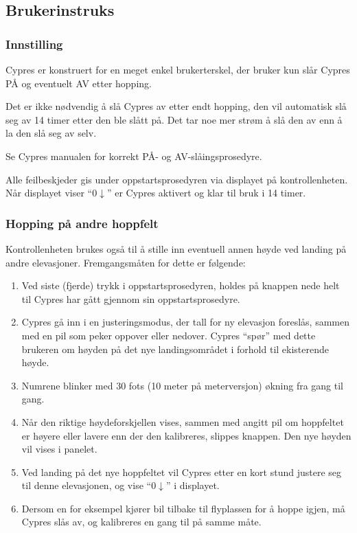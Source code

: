 \subsection{Brukerinstruks}
\subsubsection{Innstilling}
Cypres er konstruert for en meget enkel brukerterskel, der bruker kun slår Cypres PÅ og eventuelt AV etter hopping.

Det er ikke nødvendig å slå Cypres av etter endt hopping, den vil automatisk slå seg av 14 timer etter den ble slått på. Det tar noe mer strøm å slå den av enn å la den slå seg av selv.

Se Cypres manualen for korrekt PÅ- og AV-slåingsprosedyre.

Alle feilbeskjeder gis under oppstartsprosedyren via displayet på kontrollenheten. Når displayet viser ``0$\downarrow$'' er Cypres aktivert og klar til bruk i 14 timer.

\subsubsection{Hopping på andre hoppfelt}
Kontrollenheten brukes også til å stille inn eventuell annen høyde ved landing på andre elevasjoner. Fremgangsmåten for dette er følgende:
\begin{enumerate}
\item Ved siste (fjerde) trykk i oppstartsprosedyren, holdes på knappen nede helt til Cypres har gått gjennom sin oppstartsprosedyre.
\item Cypres gå inn i en justeringsmodus, der tall for ny elevasjon foreslås, sammen med en pil som peker oppover eller nedover. Cypres ``spør'' med dette brukeren om høyden på det nye landingsområdet i forhold til ekisterende høyde.
\item Numrene blinker med 30 fots (10 meter på meterversjon) økning fra gang til gang.
\item Når den riktige høydeforskjellen vises, sammen med angitt pil om hoppfeltet er høyere eller lavere enn der den kalibreres, slippes knappen. Den nye høyden vil vises i panelet.
\item Ved landing på det nye hoppfeltet vil Cypres etter en kort stund justere seg til denne elevasjonen, og vise ``0$\downarrow$'' i displayet.
\item Dersom en for eksempel kjører bil tilbake til flyplassen for å hoppe igjen, må Cypres slås av, og kalibreres en gang til på samme måte.
\end{enumerate}

